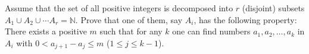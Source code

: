 Assume that the set of all positive integers is decomposed into $r$ (disjoint) subsets $A_1 \cup A_2 \cup \cdots A_r = \mathbb{N}$. Prove that one of them, say $A_i$, has the following property: There exists a positive $m$ such that for any $k$ one can find numbers $a_1, a_2, \ldots, a_k$ in $A_i$ with $0 < a_{j+1} - a_j \leq m$ ($1 \leq j \leq k - 1$).
